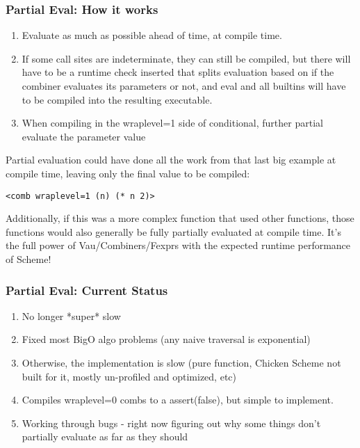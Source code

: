 \documentclass{beamer}
\begin{document}
\begin{frame}
\frametitle{Partial Eval: How it works}
  \begin{enumerate}
	\item<1-> Evaluate as much as possible ahead of time, at compile time.
	\item<2-> If some call sites are indeterminate, they can still be compiled, but there will have to be a runtime check inserted that splits evaluation based on if the combiner evaluates its parameters or not, and eval and all builtins will have to be compiled into the resulting executable.
    \item<3-> When compiling in the wraplevel=1 side of conditional, further partial evaluate the parameter value
  \end{enumerate}
\end{frame}

\begin{frame}[fragile]
Partial evaluation could have done all the work from that last big example at compile time, leaving only the final value to be compiled:
\footnotesize
\begin{verbatim}
<comb wraplevel=1 (n) (* n 2)>
\end{verbatim}
	Additionally, if this was a more complex function that used other functions, those functions would also generally be fully partially evaluated at compile time.
	It's the full power of Vau/Combiners/Fexprs with the expected runtime performance of Scheme!
\end{frame}

\begin{frame}
\frametitle{Partial Eval: Current Status}
  \begin{enumerate}
    \item<1-> No longer *super* slow
    \item<2-> Fixed most BigO algo problems (any naive traversal is exponential)
	\item<3-> Otherwise, the implementation is slow (pure function, Chicken Scheme not built for it, mostly un-profiled and optimized, etc)
	\item<4-> Compiles wraplevel=0 combs to a assert(false), but simple to implement.
	\item<5-> Working through bugs - right now figuring out why some things don't partially evaluate as far as they should
  \end{enumerate}
\end{frame}
\end{document}
